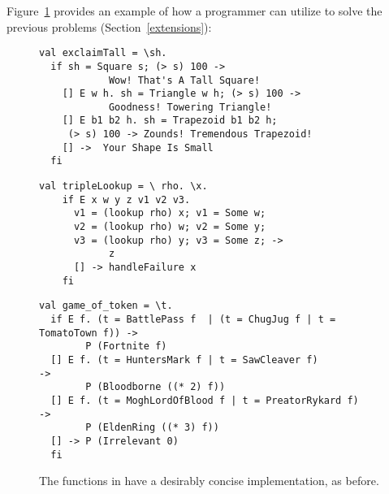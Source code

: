 \documentclass[manuscript,screen,review, 12pt, nonacm]{acmart}
\begin{document}
    Figure~\ref{fig:vminusfuncs} provides an example of how a programmer can
    utilize \VMinus to solve the previous problems (Section~\ref{extensions}): 
    
    
    \begin{figure}[ht] 
      \begin{minipage}[h]{0.54\linewidth}
        \vmlst 
        \begin{lstlisting}[numbers=none, basicstyle=\tiny, xleftmargin=.2em,
          showstringspaces=false,
          frame=single]
val exclaimTall = \sh.
  if sh = Square s; (> s) 100 -> 
            Wow! That's A Tall Square!  
    [] E w h. sh = Triangle w h; (> s) 100 ->
            Goodness! Towering Triangle!
    [] E b1 b2 h. sh = Trapezoid b1 b2 h; 
     (> s) 100 -> Zounds! Tremendous Trapezoid!
    [] ->  Your Shape Is Small
  fi 
  \end{lstlisting}
          \label{fig:vmexclaimtall} 
      \end{minipage}%
      \begin{minipage}[h]{0.5\linewidth}
        \vmlst 
        \begin{lstlisting}[numbers=none, basicstyle=\tiny, xleftmargin=2em,
                      frame=single]
  val tripleLookup = \ rho. \x.
    if E x w y z v1 v2 v3. 
      v1 = (lookup rho) x; v1 = Some w; 
      v2 = (lookup rho) w; v2 = Some y; 
      v3 = (lookup rho) y; v3 = Some z; -> 
            z 
      [] -> handleFailure x
    fi 
   \end{lstlisting}
            \label{fig:vmtriplelookup} 
        \vspace{4ex}
      \end{minipage} 
      \begin{minipage}[h]{\linewidth}
        \vmlst 
        \begin{lstlisting}[numbers=none, basicstyle=\tiny, xleftmargin=9em,
          showstringspaces=false,
          frame=single]
val game_of_token = \t. 
  if E f. (t = BattlePass f  | (t = ChugJug f | t = TomatoTown f)) -> 
        P (Fortnite f)
  [] E f. (t = HuntersMark f | t = SawCleaver f)                   -> 
        P (Bloodborne ((* 2) f))
  [] E f. (t = MoghLordOfBlood f | t = PreatorRykard f)            -> 
        P (EldenRing ((* 3) f))
  [] -> P (Irrelevant 0)
  fi 
\end{lstlisting}
          \label{fig:vmgot}
      \vspace{4ex}
      \end{minipage}%
      \caption{The functions in \VMinus have a desirably concise
      implementation, as before.}
  \label{fig:vminusfuncs}
    \end{figure}   
\end{document}
